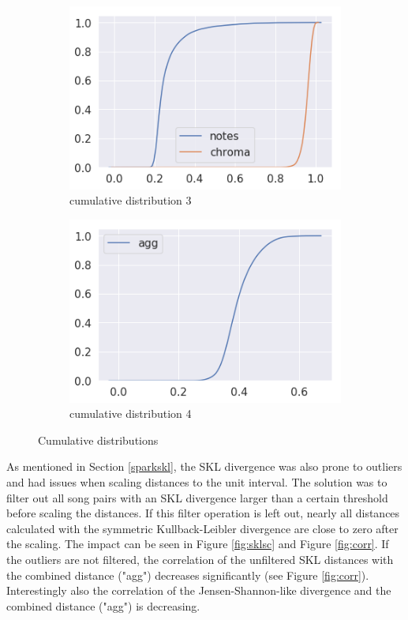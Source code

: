 \begin{figure}[htbp]
{{			\begin{subfigure}{.495\textwidth}
				\centering     
				\includegraphics[scale=0.5]{Images/SparkFeat/cum3.png}
				\caption{cumulative distribution 3}
				\label{cum3}
			\end{subfigure}%
			\begin{subfigure}{.495\textwidth}
				\centering    
				\includegraphics[scale=0.5]{Images/SparkFeat/cum4.png}
				\caption{cumulative distribution 4}
				\label{cum4}
			\end{subfigure}	
	}}
	\caption{Cumulative distributions}
	\label{fig:cumdist}
\end{figure}
\FloatBarrier

\noindent As mentioned in Section \ref{sparkskl}, the SKL divergence was also prone to outliers and had issues when scaling distances to the unit interval. The solution was to filter out all song pairs with an SKL divergence larger than a certain threshold before scaling the distances. If this filter operation is left out, nearly all distances calculated with the symmetric Kullback-Leibler divergence are close to zero after the scaling. The impact can be seen in Figure \ref{fig:sklsc} and Figure \ref{fig:corr}.
\noindent If the outliers are not filtered, the correlation of the unfiltered SKL distances with the combined distance ("agg") decreases significantly (see Figure \ref{fig:corr}). Interestingly also the correlation of the Jensen-Shannon-like divergence and the combined distance ("agg") is decreasing. 

